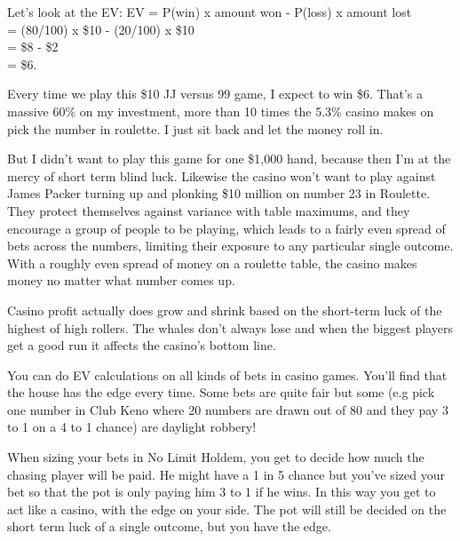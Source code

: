 Let's look at the EV:
EV = P(win) x amount won - P(loss) x amount lost \\
   = (80/100) x \$10 - (20/100) x \$10 \\
   = \$8 - \$2 \\
   = \$6.

Every time we play this \$10 JJ versus 99 game, I expect to win \$6. That's a
massive 60\% on my investment, more than 10 times the 5.3\% casino makes on
pick the number in roulette. I just sit back and let the money roll in.

But I didn't want to play this game for one \$1,000 hand, because then
I'm at the mercy of short term blind luck. Likewise the casino won't
want to play against James Packer turning up and plonking \$10 million
on number 23 in Roulette. They protect themselves against variance
with table maximums, and they encourage a group of people to be playing,
which leads to a fairly even spread of bets across the numbers, limiting
their exposure to any particular single outcome. With a roughly even spread
of money on a roulette table, the casino makes money no matter what
number comes up.

Casino profit actually does grow and shrink based on the short-term
luck of the highest of high rollers. The whales don't always lose and
when the biggest players get a good run it affects the casino's bottom
line.

You can do EV calculations on all kinds of bets in casino games.
You'll find that the house has the edge every time. Some bets
are quite fair but some (e.g pick one number in Club Keno
where 20 numbers are drawn out of 80 and they pay
3 to 1 on a 4 to 1 chance) are daylight robbery!



When sizing your bets in No Limit Holdem, you get to decide how much
the chasing player will be paid. He might have a 1 in 5 chance
but you've sized your bet so that the pot is only paying him 3 to 1
if he wins. In this way you get to act like a casino, with the edge
on your side. The pot will still be decided on the short term luck
of a single outcome, but you have the edge.

